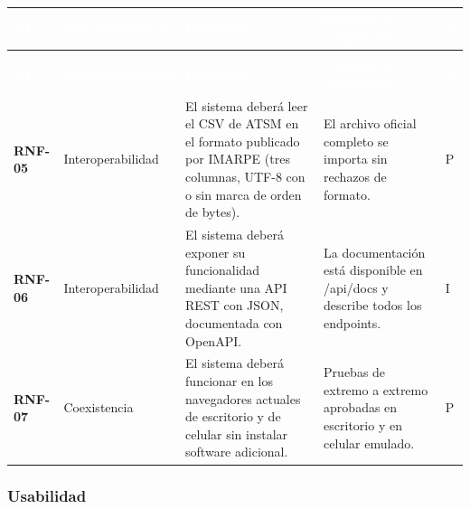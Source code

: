 \documentclass[11pt,a4paper,oneside]{article}
\begin{document}
{\footnotesize
\begin{xltabular}{\textwidth}{@{}>{\sffamily\bfseries}p{1.45cm}>{\raggedright\arraybackslash}p{2.4cm}YY>{\raggedright\arraybackslash}p{0.45cm}@{}}
\textcolor{white}{\sffamily\bfseries\footnotesize ID} & \textcolor{white}{\sffamily\bfseries\footnotesize Subcaracterística} & \textcolor{white}{\sffamily\bfseries\footnotesize Enunciado} & \textcolor{white}{\sffamily\bfseries\footnotesize Criterio de aceptación} & \textcolor{white}{\sffamily\bfseries\footnotesize V}\\
\endfirsthead
{}\\
\textcolor{white}{\sffamily\bfseries\footnotesize ID} & \textcolor{white}{\sffamily\bfseries\footnotesize Subcaracterística} & \textcolor{white}{\sffamily\bfseries\footnotesize Enunciado} & \textcolor{white}{\sffamily\bfseries\footnotesize Criterio de aceptación} & \textcolor{white}{\sffamily\bfseries\footnotesize V}\\
\endhead
RNF-05 & Interoperabilidad & El sistema deberá leer el CSV de ATSM en el formato publicado por IMARPE (tres columnas, UTF-8 con o sin marca de orden de bytes). & El archivo oficial completo se importa sin rechazos de formato. & P\\ \hline
{}RNF-06 & Interoperabilidad & El sistema deberá exponer su funcionalidad mediante una API REST con JSON, documentada con OpenAPI. & La documentación está disponible en /api/docs y describe todos los endpoints. & I\\ \hline
RNF-07 & Coexistencia & El sistema deberá funcionar en los navegadores actuales de escritorio y de celular sin instalar software adicional. & Pruebas de extremo a extremo aprobadas en escritorio y en celular emulado. & P\\ \hline
\end{xltabular}}
\vspace{0.6em}

\subsubsection{Usabilidad}
\end{document}

